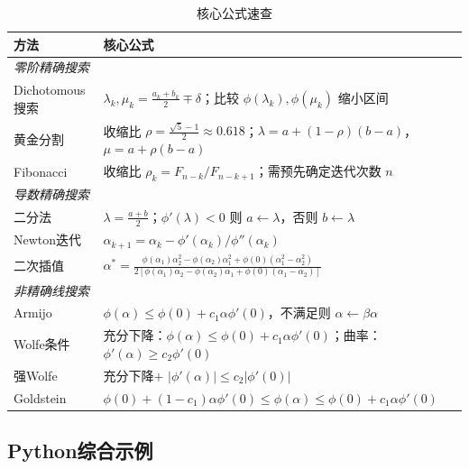 \begin{table}[H]
\centering
\caption{核心公式速查}
\begin{tabular}{@{}p{3.5cm}p{9cm}@{}}
\toprule
\textbf{方法} & \textbf{核心公式} \\
\midrule
\multicolumn{2}{l}{\textit{零阶精确搜索}} \\
Dichotomous搜索 & $\lambda_k, \mu_k = \frac{a_k+b_k}{2} \mp \delta$；比较 $\phi(\lambda_k), \phi(\mu_k)$ 缩小区间 \\
黄金分割 & 收缩比 $\rho = \frac{\sqrt{5}-1}{2} \approx 0.618$；$\lambda = a+(1-\rho)(b-a)$，$\mu = a+\rho(b-a)$ \\
Fibonacci & 收缩比 $\rho_k = F_{n-k}/F_{n-k+1}$；需预先确定迭代次数 $n$ \\
\midrule
\multicolumn{2}{l}{\textit{导数精确搜索}} \\
二分法 & $\lambda = \frac{a+b}{2}$；$\phi'(\lambda)<0$ 则 $a\leftarrow\lambda$，否则 $b\leftarrow\lambda$ \\
Newton迭代 & $\alpha_{k+1} = \alpha_k - \phi'(\alpha_k)/\phi''(\alpha_k)$ \\
二次插值 & $\alpha^* = \frac{\phi(\alpha_1)\alpha_2^2 - \phi(\alpha_2)\alpha_1^2 + \phi(0)(\alpha_1^2-\alpha_2^2)}{2[\phi(\alpha_1)\alpha_2 - \phi(\alpha_2)\alpha_1 + \phi(0)(\alpha_1-\alpha_2)]}$ \\
\midrule
\multicolumn{2}{l}{\textit{非精确线搜索}} \\
Armijo & $\phi(\alpha) \leq \phi(0) + c_1 \alpha \phi'(0)$，不满足则 $\alpha \leftarrow \beta\alpha$ \\
Wolfe条件 & 充分下降：$\phi(\alpha) \leq \phi(0) + c_1\alpha\phi'(0)$；曲率：$\phi'(\alpha) \geq c_2\phi'(0)$ \\
强Wolfe & 充分下降$+$ $|\phi'(\alpha)| \leq c_2|\phi'(0)|$ \\
Goldstein & $\phi(0)+(1-c_1)\alpha\phi'(0) \leq \phi(\alpha) \leq \phi(0)+c_1\alpha\phi'(0)$ \\
\bottomrule
\end{tabular}
\end{table}

\subsection{Python综合示例}

